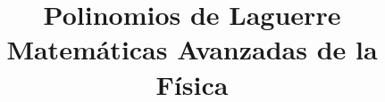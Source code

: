 
\usepackage{mathrsfs}
\usepackage{bigints}
\usepackage{standalone}
\newcommand{\saltosin}{\nonumber \\}
\newcommand{\dprima}[1]{#1^{\prime \prime}}
\newcommand{\prima}[1]{#1^{\prime}}
\newtheorem{teorema}{{\it Teorema}}[section]
\author{}
\title{Polinomios de Laguerre \\ {\large Matemáticas Avanzadas de la Física}}
\date{ }

\maketitle
\fontsize{14}{14}\selectfont
% 
